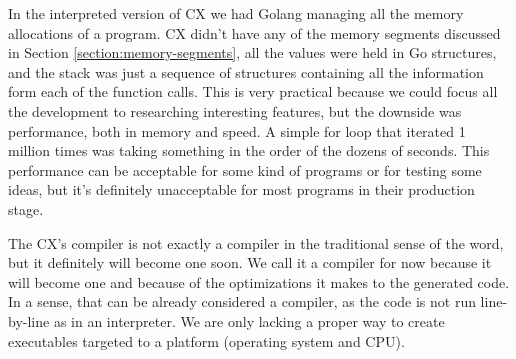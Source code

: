 \documentclass[11pt,fleqn,openany]{book} %
\begin{document}

In the interpreted version of CX we had Golang managing all the memory allocations of a program. CX didn't have any of the memory segments discussed in Section \ref{section:memory-segments}, all the values were held in Go structures, and the stack was just a sequence of structures containing all the information form each of the function calls. This is very practical because we could focus all the development to researching interesting features, but the downside was performance, both in memory and speed. A simple for loop that iterated 1 million times was taking something in the order of the dozens of seconds. This performance can be acceptable for some kind of programs or for testing some ideas, but it's definitely unacceptable for most programs in their production stage.

The CX's compiler is not exactly a compiler in the traditional sense of the word, but it definitely will become one soon. We call it a compiler for now because it will become one and because of the optimizations it makes to the generated code. In a sense, that can be already considered a compiler, as the code is not run line-by-line as in an interpreter. We are only lacking a proper way to create executables targeted to a platform (operating system and CPU).
\end{document}
